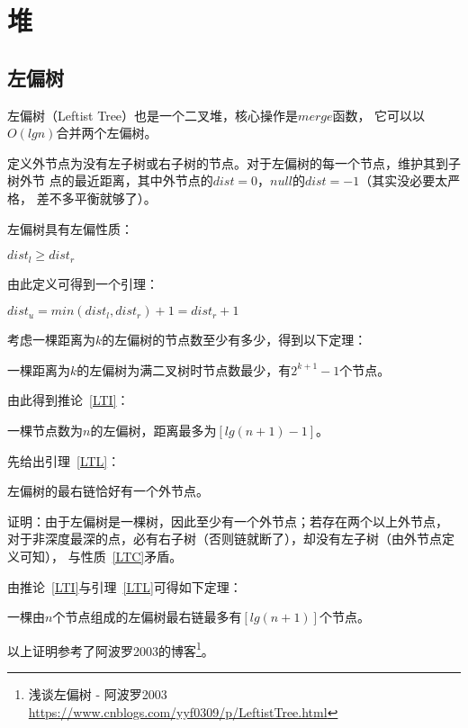 \section{堆}
\subsection{左偏树}
左偏树（Leftist Tree）也是一个二叉堆，核心操作是$merge$函数，
它可以以$O(lgn)$合并两个左偏树。

定义外节点为没有左子树或右子树的节点。对于左偏树的每一个节点，维护其到子树外节
点的最近距离，其中外节点的$dist=0$，$null$的$dist=-1$（其实没必要太严格，
差不多平衡就够了）。

左偏树具有左偏性质：
\begin{character}\label{LTC}
    $dist_l \geq dist_r$
\end{character}

由此定义可得到一个引理：

\begin{lemma}
    $dist_u=min(dist_l,dist_r)+1=dist_r+1$
\end{lemma}

考虑一棵距离为$k$的左偏树的节点数至少有多少，得到以下定理：

\begin{theorem}
    一棵距离为$k$的左偏树为满二叉树时节点数最少，有$2^{k+1}-1$个节点。
\end{theorem}

由此得到推论~\ref{LTI}：

\begin{inference}\label{LTI}
    一棵节点数为$n$的左偏树，距离最多为$[lg(n+1)-1]$。
\end{inference}

先给出引理~\ref{LTL}：

\begin{lemma}\label{LTL}
    左偏树的最右链恰好有一个外节点。
\end{lemma}

证明：由于左偏树是一棵树，因此至少有一个外节点；若存在两个以上外节点，
对于非深度最深的点，必有右子树（否则链就断了），却没有左子树（由外节点定义可知），
与性质~\ref{LTC}矛盾。

由推论~\ref{LTI}与引理~\ref{LTL}可得如下定理：

\begin{theorem}\label{LTT}
    一棵由$n$个节点组成的左偏树最右链最多有$[lg(n+1)]$个节点。
\end{theorem}

以上证明参考了阿波罗2003的博客\footnote{
    浅谈左偏树 - 阿波罗2003
    \url{https://www.cnblogs.com/yyf0309/p/LeftistTree.html}
}。

